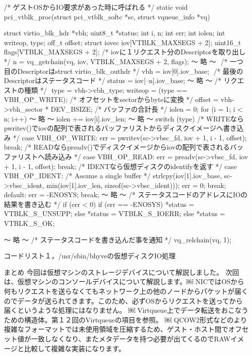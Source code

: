 /* ゲストOSからIO要求があった時に呼ばれる */
static void
pci_vtblk_proc(struct pci_vtblk_softc *sc, struct vqueue_info *vq)
{
	struct virtio_blk_hdr *vbh;
	uint8_t *status;
	int i, n;
	int err;
	int iolen;
	int writeop, type;
	off_t offset;
	struct iovec iov[VTBLK_MAXSEGS + 2];
	uint16_t flags[VTBLK_MAXSEGS + 2];
	/* iovに１リクエスト分のDescriptorを取り出し */
	n = vq_getchain(vq, iov, VTBLK_MAXSEGS + 2, flags);
					〜 略 〜 	/* 一つ目のDescriptorはstruct virtio_blk_outhdr */
	vbh = iov[0].iov_base; 	/* 最後のDescriptorはステータスコード */
	status = iov[--n].iov_base;
					〜 略 〜
	/* リクエストの種類 */ 	type = vbh->vbh_type;
	writeop = (type == VBH_OP_WRITE);
	/* オフセットをsectorからbyteに変換 */
	offset = vbh->vbh_sector * DEV_BSIZE;
	/* バッファの合計長 */
	iolen = 0;
	for (i = 1; i < n; i++) {
					〜 略 〜
		iolen += iov[i].iov_len;
	}
					〜 略 〜
	switch (type) {
	/* WRITEならpwritev()でiovの配列で表されるバッファリストからディスクイメージへ書き込み */
	case VBH_OP_WRITE:
		err = pwritev(sc->vbsc_fd, iov + 1, i - 1, offset);
		break;
	/* READならpreadv()でディスクイメージからiovの配列で表されるバッファリストへ読み込み */
	case VBH_OP_READ:
		err = preadv(sc->vbsc_fd, iov + 1, i - 1, offset);
		break;
	/* IDENTなら仮想ディスクのidentifyを返す */
	case VBH_OP_IDENT:
		/* Assume a single buffer */
		strlcpy(iov[1].iov_base, sc->vbsc_ident,
		    min(iov[1].iov_len, sizeof(sc->vbsc_ident)));
		err = 0;
		break;
	default:
		err = -ENOSYS;
		break;
	}
					〜 略 〜
	/* ステータスコードのアドレスにIOの結果を書き込む */
	if (err < 0) {
		if (err == -ENOSYS)
			*status = VTBLK_S_UNSUPP;
		else
			*status = VTBLK_S_IOERR;
	} else
		*status = VTBLK_S_OK;

					〜 略 〜
	/* ステータスコードを書き込んだ事を通知 */
	vq_relchain(vq, 1);
}
コードリスト１，/usr/sbin/bhyveの仮想ディスクIO処理

まとめ
今回は仮想マシンのストレージデバイスについて解説しました。
次回は、仮想マシンのコンソールデバイスについて解説します。￼ NICではOSから何もリクエストを送らなくてもネットワーク上の他のノードからパケットが届くのでデータが送られてきます。このため、必ずOSからリクエストを送ってから届くというような処理にはなりません。
￼ Virtqueue上でデータ転送をおこなうための構造体。第１２回のVirtqueueの項目を参照。
￼ QCOW2形式などのより複雑なフォーマットでは未使用領域を圧縮するため、ゲスト・ホスト間でオフセット値が一致しなくなり、またメタデータを持つ必要が出てくるのでRAWイメージと比較して複雑な実装になります。
